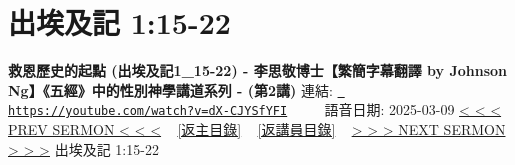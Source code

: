 \documentclass{book}
\begin{document}
\section{出埃及記 1:15-22}
\label{sec:dX_CJYSfYFI}
\textbf{救恩歷史的起點 (出埃及記1\_15-22) - 李思敬博士【繁簡字幕翻譯 by Johnson Ng】《五經》中的性別神學講道系列 - (第2講)}
\newline
\newline
連結: \href{https://youtube.com/watch?v=dX-CJYSfYFI}{\texttt{ https://youtube.com/watch?v=dX-CJYSfYFI}} ~~~~ 語音日期: 2025-03-09 
\newline
\newline
\hyperref[sec:cau3XNPSx68]{< < < PREV SERMON < < <}
~
\hyperlink{toc}{[返主目錄]}
~
\hyperref[ch:preacher5]{[返講員目錄]}
~
\hyperref[sec:YdX9gstJs1g]{> > > NEXT SERMON > > >}
\newline
\newline
出埃及記 1:15-22
\newline
\end{document}
